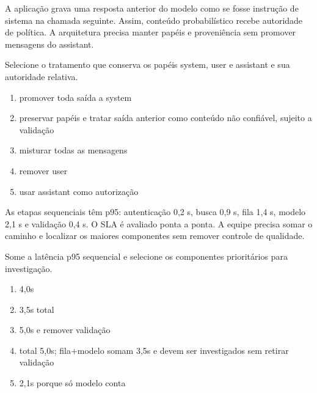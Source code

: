 A aplicação grava uma resposta anterior do modelo como se fosse instrução de sistema na chamada seguinte. Assim, conteúdo probabilístico recebe autoridade de política. A arquitetura precisa manter papéis e proveniência sem promover mensagens do assistant.

\FonteDidatica

\Comando Selecione o tratamento que conserva os papéis system, user e assistant e sua autoridade relativa.

\begin{enumerate}[label=\Alph*)]

\item promover toda saída a system

\item preservar papéis e tratar saída anterior como conteúdo não confiável, sujeito a validação

\item misturar todas as mensagens

\item remover user

\item usar assistant como autorização

\end{enumerate}


\TextoBase

As etapas sequenciais têm p95: autenticação 0,2 s, busca 0,9 s, fila 1,4 s, modelo 2,1 s e validação 0,4 s. O SLA é avaliado ponta a ponta. A equipe precisa somar o caminho e localizar os maiores componentes sem remover controle de qualidade.

\FonteDidatica

\Comando Some a latência p95 sequencial e selecione os componentes prioritários para investigação.

\begin{enumerate}[label=\Alph*)]

\item 4,0s

\item 3,5s total

\item 5,0s e remover validação

\item total 5,0s; fila+modelo somam 3,5s e devem ser investigados sem retirar validação

\item 2,1s porque só modelo conta

\end{enumerate}

